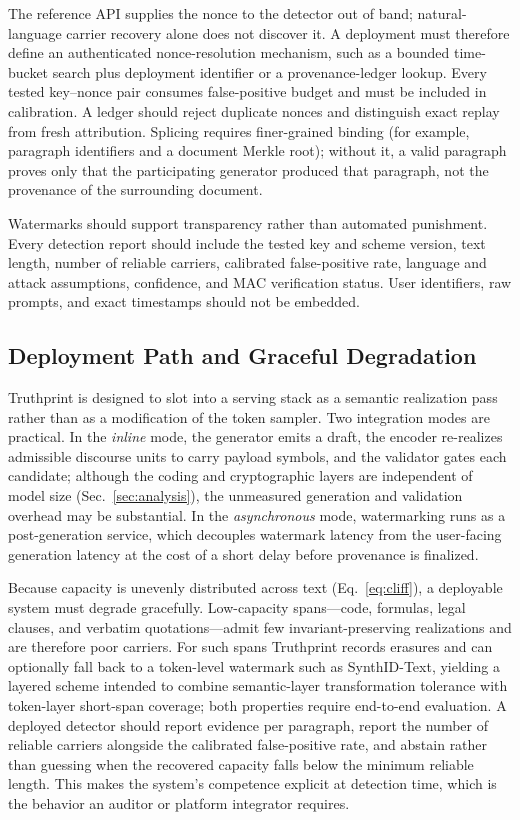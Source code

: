 \documentclass[journal]{IEEEtran}
\begin{document}
The reference API supplies the nonce to the detector out of band; natural-language carrier recovery alone does not discover it. A deployment must therefore define an authenticated nonce-resolution mechanism, such as a bounded time-bucket search plus deployment identifier or a provenance-ledger lookup. Every tested key--nonce pair consumes false-positive budget and must be included in calibration. A ledger should reject duplicate nonces and distinguish exact replay from fresh attribution. Splicing requires finer-grained binding (for example, paragraph identifiers and a document Merkle root); without it, a valid paragraph proves only that the participating generator produced that paragraph, not the provenance of the surrounding document.

Watermarks should support transparency rather than automated punishment. Every detection report should include the tested key and scheme version, text length, number of reliable carriers, calibrated false-positive rate, language and attack assumptions, confidence, and MAC verification status. User identifiers, raw prompts, and exact timestamps should not be embedded.

\subsection{Deployment Path and Graceful Degradation}
Truthprint is designed to slot into a serving stack as a semantic realization pass rather than as a modification of the token sampler. Two integration modes are practical. In the \emph{inline} mode, the generator emits a draft, the encoder re-realizes admissible discourse units to carry payload symbols, and the validator gates each candidate; although the coding and cryptographic layers are independent of model size (Sec.~\ref{sec:analysis}), the unmeasured generation and validation overhead may be substantial. In the \emph{asynchronous} mode, watermarking runs as a post-generation service, which decouples watermark latency from the user-facing generation latency at the cost of a short delay before provenance is finalized.

Because capacity is unevenly distributed across text (Eq.~\ref{eq:cliff}), a deployable system must degrade gracefully. Low-capacity spans---code, formulas, legal clauses, and verbatim quotations---admit few invariant-preserving realizations and are therefore poor carriers. For such spans Truthprint records erasures and can optionally fall back to a token-level watermark such as SynthID-Text, yielding a layered scheme intended to combine semantic-layer transformation tolerance with token-layer short-span coverage; both properties require end-to-end evaluation. A deployed detector should report evidence per paragraph, report the number of reliable carriers alongside the calibrated false-positive rate, and abstain rather than guessing when the recovered capacity falls below the minimum reliable length. This makes the system's competence explicit at detection time, which is the behavior an auditor or platform integrator requires.
\end{document}
